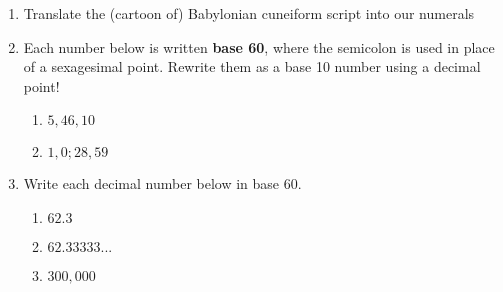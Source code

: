 \documentclass[12pt]{article}
\renewcommand{\emph}[1]{\textsf{\textbf{#1}}}
\begin{document}
\begin{enumerate}
\item Translate the (cartoon of) Babylonian cuneiform script into our numerals
	\vfill
\item Each number below is written \emph{base 60}, where the semicolon is used in place of a sexagesimal point. Rewrite them as a base 10 number using a decimal point!
	\begin{enumerate}
	\item $5,46,10$\\
	\vfill
	\item $1,0;28,59$\\
	\vfill
	\end{enumerate}
	
\item Write each decimal number below in base 60.
	\begin{enumerate}
	\item $62.3$\\
	\vfill
	\item $62.33333...$\\
	\vfill
	\item $300,000$
	\vfill
	\end{enumerate}
\end{enumerate}
\end{document}
